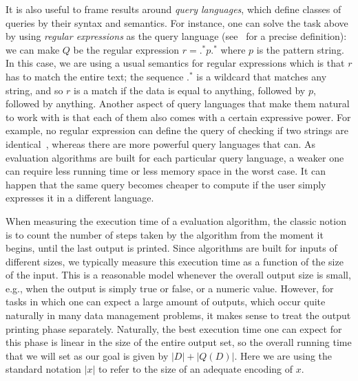 It is also useful to frame results around {\it query languages}, which define classes of queries by their syntax and semantics. For instance, one can solve the task above by using {\it regular expressions} as the query language (see~\cite{automatahandbook} for a precise definition): we can make $Q$ be the regular expression $r = \texttt{.}^\texttt{*}p\texttt{.}^\texttt{*}$ where $p$ is the pattern string. In this case, we are using a usual semantics for regular expressions which is that $r$ has to match the entire text; the sequence $\texttt{.}^\texttt{*}$ is a wildcard that matches any string, and so $r$ is a match if the data is equal to anything, followed by $p$, followed by anything. Another aspect of query languages that make them natural to work with is that each of them also comes with a certain expressive power. For example, no regular expression can define the query of checking if two strings are identical~\cite{automatahandbook}, whereas there are more powerful query languages that can. As evaluation algorithms are built for each particular query language, a weaker one can require less running time or less memory space in the worst case. It can happen that the same query becomes cheaper to compute if the user simply expresses it in a different language. 

When measuring the execution time of a evaluation algorithm, the classic notion is to count the number of steps taken by the algorithm from the moment it begins, until the last output is printed. Since algorithms are built for inputs of different sizes, we typically measure this execution time as a function of the size of the input.
This is a reasonable model whenever the overall output size is small, e.g., when the output is simply true or false, or a numeric value. However, for tasks in which one can expect a large amount of outputs, which occur quite naturally in many data management problems, it makes sense to treat the output printing phase separately. Naturally, the best execution time one can expect for this phase is linear in the size of the entire output set, so the overall running time that we will set as our goal is given by $|D| + |Q(D)|$. Here we are using the standard notation $|x|$ to refer to the size of an adequate encoding of $x$.

